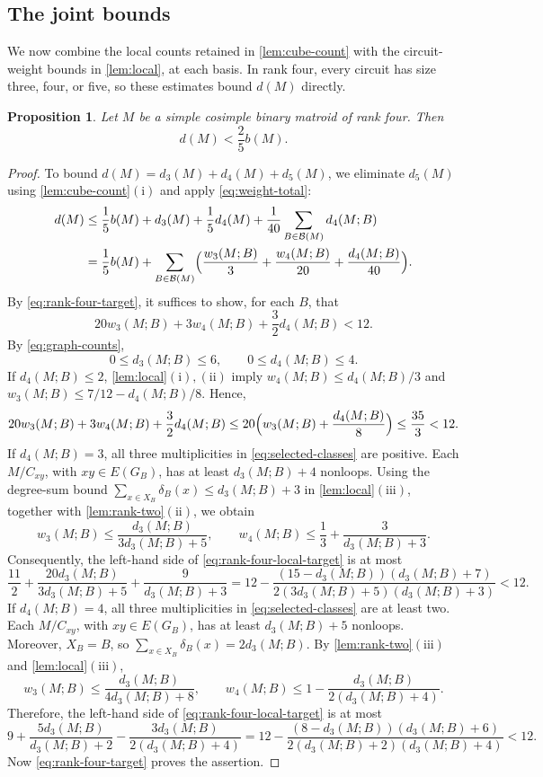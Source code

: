\documentclass[10pt,a4paper]{article}
\numberwithin{equation}{section}
\newtheorem{proposition}[proposition]{Proposition}
\newcommand{\BB}{\mathcal B}
\newcommand{\wloc}[1]{w_{#1}(M;B)}
\newcommand{\dloc}[1]{d_{#1}(M;B)}
\begin{document}
\subsection{The joint bounds}

We now combine the local counts retained in \autoref{lem:cube-count}
with the circuit-weight bounds in \autoref{lem:local}, at each basis.
In rank four, every circuit has size three, four, or five,
so these estimates bound \(d(M)\) directly.

\begin{proposition}\label{prop:rank-four}
Let \(M\) be a simple cosimple binary matroid of rank four. Then
\[
 d(M)<\frac25 b(M).
\]
\end{proposition}
\begin{proof}
To bound \(d(M)=d_3(M)+d_4(M)+d_5(M)\), we eliminate \(d_5(M)\)
using \autoref{lem:cube-count}\(\mathrm{(i)}\) and apply \eqref{eq:weight-total}:
\begin{align}
 d(M)&\le\frac15b(M)+d_3(M)+\frac15d_4(M)
       +\frac1{40}\sum_{B\in\BB(M)}\dloc4\notag\\
 &=\frac15b(M)+\sum_{B\in\BB(M)}
 \Bigl(\frac{\wloc3}3+\frac{\wloc4}{20}+\frac{\dloc4}{40}\Bigr).
 \label{eq:rank-four-target}
\end{align}
By \eqref{eq:rank-four-target}, it suffices to show, for each \(B\), that
\begin{equation}\label{eq:rank-four-local-target}
 20\wloc3+3\wloc4+\frac32\dloc4<12.
\end{equation}
By \eqref{eq:graph-counts},
\[
 0\le\dloc3\le6,\qquad 0\le\dloc4\le4.
\]
If \(\dloc4\le2\), \autoref{lem:local}\(\mathrm{(i),(ii)}\) imply
\(\wloc4\le\dloc4/3\) and
\(\wloc3\le7/12-\dloc4/8\). Hence,
\[
 20\wloc3+3\wloc4+\frac32\dloc4
 \le20\Bigl(\wloc3+\frac{\dloc4}8\Bigr)\le\frac{35}3<12.
\]
If \(\dloc4=3\), all three multiplicities in
\eqref{eq:selected-classes} are positive.
Each \(M/C_{xy}\), with \(xy\in E(G_B)\), has at least
\(\dloc3+4\) nonloops.
Using the degree-sum bound \(\sum_{x\in X_B}\delta_B(x)\le\dloc3+3\)
in \autoref{lem:local}\(\mathrm{(iii)}\), together with
\autoref{lem:rank-two}\(\mathrm{(ii)}\), we obtain
\[
 \wloc3\le\frac{\dloc3}{3\dloc3+5},\qquad
 \wloc4\le\frac13+\frac3{\dloc3+3}.
\]
Consequently, the left-hand side of \eqref{eq:rank-four-local-target}
is at most
\[
 \frac{11}2+\frac{20\dloc3}{3\dloc3+5}+\frac9{\dloc3+3}
 =12-\frac{(15-\dloc3)(\dloc3+7)}
 {2(3\dloc3+5)(\dloc3+3)}<12.
\]
If \(\dloc4=4\), all three multiplicities in
\eqref{eq:selected-classes} are at least two.
Each \(M/C_{xy}\), with \(xy\in E(G_B)\), has at least
\(\dloc3+5\) nonloops. Moreover,
\(X_B=B\), so \(\sum_{x\in X_B}\delta_B(x)=2\dloc3\).
By \autoref{lem:rank-two}\(\mathrm{(iii)}\) and
\autoref{lem:local}\(\mathrm{(iii)}\),
\[
 \wloc3\le\frac{\dloc3}{4\dloc3+8},\qquad
 \wloc4\le1-\frac{\dloc3}{2(\dloc3+4)}.
\]
Therefore, the left-hand side of \eqref{eq:rank-four-local-target} is at most
\[
 9+\frac{5\dloc3}{\dloc3+2}-\frac{3\dloc3}{2(\dloc3+4)}
 =12-\frac{(8-\dloc3)(\dloc3+6)}
 {2(\dloc3+2)(\dloc3+4)}<12.
\]
Now \eqref{eq:rank-four-target} proves the assertion.
\end{proof}
\end{document}
